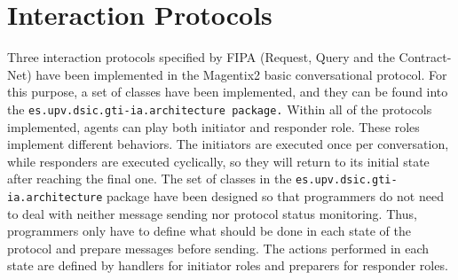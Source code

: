 




\section{Interaction Protocols}
Three interaction protocols specified by FIPA (Request, Query and the Contract-Net) have been implemented in the Magentix2 basic conversational protocol. For this purpose, a set of classes have been implemented, and they can be found into the \lstinline|es.upv.dsic.gti-ia.architecture package.|
Within all of the protocols implemented, agents can play both initiator and responder role. These roles implement different behaviors. The initiators  are executed once per conversation, while responders are executed cyclically, so they will return to its initial state after reaching the final one.
The set of classes in the \lstinline|es.upv.dsic.gti-ia.architecture| package have been designed so that programmers do not need to deal with neither message sending nor protocol status monitoring. Thus, programmers only have to define what should be done in each state of the protocol and prepare messages before sending. The actions performed in each state are defined by handlers for initiator roles and preparers for responder roles.

